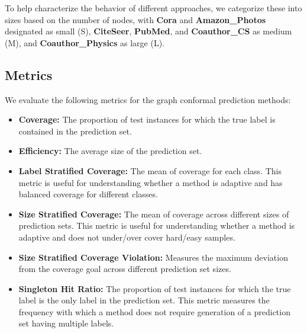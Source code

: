 To help characterize the behavior of different approaches, we categorize these into sizes based on the number of nodes, with \textbf{Cora} and \textbf{Amazon\_Photos} designated as small (S), \textbf{CiteSeer}, \textbf{PubMed}, and \textbf{Coauthor\_CS} as medium (M), and \textbf{Coauthor\_Physics} as large (L).

\subsection{Metrics}
We evaluate the following metrics for the graph conformal prediction methods:
\begin{itemize}
    \item \textbf{Coverage:} The proportion of test instances for which the true label is contained in the prediction set.
    \item \textbf{Efficiency:} The average size of the prediction set.
    \item \textbf{Label Stratified Coverage:} The mean of coverage for each class. This metric is useful for understanding whether a method is adaptive and has balanced coverage for different classes.
    \item \textbf{Size Stratified Coverage:} The mean of coverage across different sizes of prediction sets. This metric is useful for understanding whether a method is adaptive and does not under/over cover hard/easy samples.
    \item \textbf{Size Stratified Coverage Violation:} Measures the maximum deviation from the coverage goal across different prediction set sizes. 
    \item \textbf{Singleton Hit Ratio:} The proportion of test instances for which the true label is the only label in the prediction set. This metric measures the frequency with which a method does not require generation of a prediction set having multiple labels.
\end{itemize}

